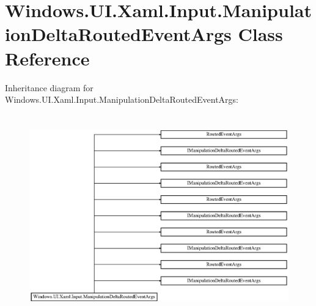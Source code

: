 \hypertarget{class_windows_1_1_u_i_1_1_xaml_1_1_input_1_1_manipulation_delta_routed_event_args}{}\section{Windows.\+U\+I.\+Xaml.\+Input.\+Manipulation\+Delta\+Routed\+Event\+Args Class Reference}
\label{class_windows_1_1_u_i_1_1_xaml_1_1_input_1_1_manipulation_delta_routed_event_args}
Inheritance diagram for Windows.\+U\+I.\+Xaml.\+Input.\+Manipulation\+Delta\+Routed\+Event\+Args\+:\begin{figure}[H]
\begin{center}
\leavevmode
\includegraphics[height=8.774929cm]{class_windows_1_1_u_i_1_1_xaml_1_1_input_1_1_manipulation_delta_routed_event_args}
\end{center}
\end{figure}
